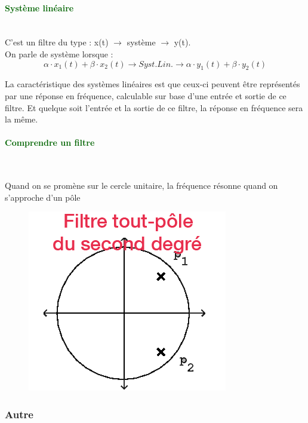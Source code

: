 \documentclass[letterpaper, 12pt]{article}
\newcommand{\alinea}{
\hspace*{0.3cm}}
\newcommand{\green}[1]{
	\textcolor{darkgreen}{#1}
}
\newcommand{\myul}[1]{
	\underline{\smash{#1}}
}
\begin{document}
			\paragraph{\green{Système linéaire}}~\\
				\alinea C'est un filtre du type : x(t) $\rightarrow$ système $\rightarrow$ y(t).\\
				On parle de système \myul{linéaire} lorsque :
				$$ \alpha\cdot x_1(t) + \beta\cdot x_2(t) \rightarrow Syst. Lin. \rightarrow \alpha\cdot y_1(t) 
				+ \beta\cdot y_2(t)  $$
				\alinea La caractéristique des systèmes linéaires est que ceux-ci peuvent être représentés
				par une réponse en fréquence, calculable sur base d'une entrée et sortie de ce filtre.
				Et quelque soit l'entrée et la sortie de ce filtre, la réponse en fréquence sera la même.
			\paragraph{\green{Comprendre un filtre}}~\\
				\begin{minipage}{0.35\textwidth}
					\alinea Quand on se promène sur le cercle unitaire, la fréquence résonne quand on s'approche 
					d'un pôle
				\end{minipage}\hfill
				\begin{minipage}{0.45\textwidth}
					\begin{figure}[H]
						\centering
						\includegraphics[scale=0.42]{Images/filtre}
					\end{figure}\noindent
				\end{minipage}
		\subsubsection{Autre}
\end{document}
